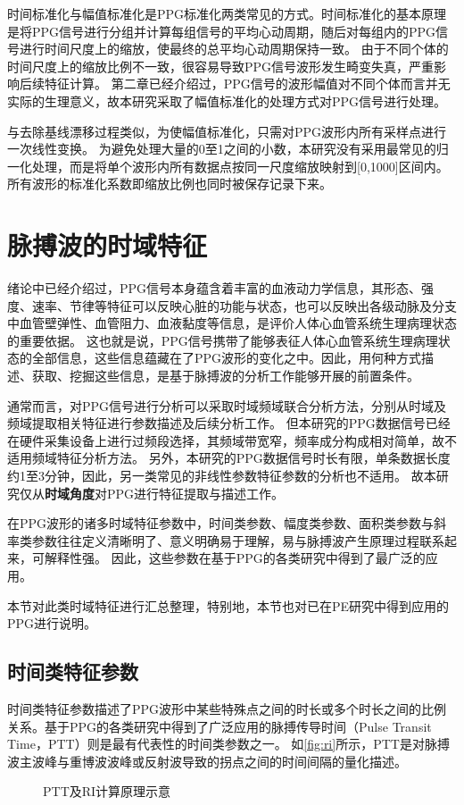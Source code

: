 时间标准化与幅值标准化是PPG标准化两类常见的方式\cite{mmt}。时间标准化的基本原理是将PPG信号进行分组并计算每组信号的平均心动周期，随后对每组内的PPG信号进行时间尺度上的缩放，使最终的总平均心动周期保持一致。
由于不同个体的时间尺度上的缩放比例不一致，很容易导致PPG信号波形发生畸变失真，严重影响后续特征计算。
第二章已经介绍过，PPG信号的波形幅值对不同个体而言并无实际的生理意义，故本研究采取了幅值标准化的处理方式对PPG信号进行处理。

与去除基线漂移过程类似，为使幅值标准化，只需对PPG波形内所有采样点进行一次线性变换。
为避免处理大量的0至1之间的小数，本研究没有采用最常见的归一化处理，而是将单个波形内所有数据点按同一尺度缩放映射到[0,1000]区间内。
所有波形的标准化系数即缩放比例也同时被保存记录下来。

\section{脉搏波的时域特征}
绪论中已经介绍过，PPG信号本身蕴含着丰富的血液动力学信息，其形态、强度、速率、节律等特征可以反映心脏的功能与状态，也可以反映出各级动脉及分支中血管壁弹性、血管阻力、血液黏度等信息，是评价人体心血管系统生理病理状态的重要依据\cite{PPGYY}。
这也就是说，PPG信号携带了能够表征人体心血管系统生理病理状态的全部信息，这些信息蕴藏在了PPG波形的变化之中。因此，用何种方式描述、获取、挖掘这些信息，是基于脉搏波的分析工作能够开展的前置条件。

通常而言，对PPG信号进行分析可以采取时域频域联合分析方法，分别从时域及频域提取相关特征进行参数描述及后续分析工作。
但本研究的PPG数据信号已经在硬件采集设备上进行过频段选择，其频域带宽窄，频率成分构成相对简单，故不适用频域特征分析方法。
另外，本研究的PPG数据信号时长有限，单条数据长度约1至3分钟，因此，另一类常见的非线性参数特征参数的分析也不适用。
故本研究仅从\textbf{时域角度}对PPG进行特征提取与描述工作。

在PPG波形的诸多时域特征参数中，时间类参数、幅度类参数、面积类参数与斜率类参数往往定义清晰明了、意义明确易于理解，易与脉搏波产生原理过程联系起来，可解释性强。
因此，这些参数在基于PPG的各类研究中得到了最广泛的应用\cite{cwl,mmt}。

本节对此类时域特征进行汇总整理，特别地，本节也对已在PE研究中得到应用的PPG进行说明。

\subsection{时间类特征参数}
时间类特征参数描述了PPG波形中某些特殊点之间的时长或多个时长之间的比例关系。基于PPG的各类研究中得到了广泛应用的脉搏传导时间（Pulse Transit Time，PTT）则是最有代表性的时间类参数之一\cite{Brumfield2005,Su2014}。
如\autoref{fig:ri}所示，PTT是对脉搏波主波峰与重博波波峰或反射波导致的拐点之间的时间间隔的量化描述。
\begin{figure}[htbp]
    \centering
    \quad
    \caption[PTT及RI计算原理示意]{\label{fig:ri}PTT及RI计算原理示意\cite{Su2014}}
\end{figure}

